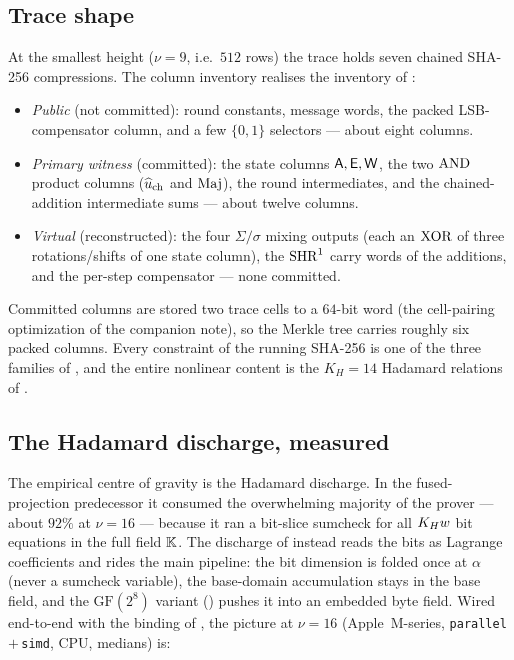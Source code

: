 \subsection{Trace shape}
\label{sec:impl-trace}

At the smallest height ($\nu=9$, i.e.\ $512$ rows) the trace holds seven
chained SHA-256 compressions. The column inventory realises the inventory
of :
\begin{itemize}[leftmargin=2em]
  \item \emph{Public} (not committed): round constants, message words, the
    packed LSB-compensator column, and a few $\{0,1\}$ selectors --- about
    eight columns.
  \item \emph{Primary witness} (committed): the state columns
    $\mathsf{A},\mathsf{E},\mathsf{W}$, the two $\operatorname{AND}$ product columns
    ($\widehat{u}_{\mathrm{ch}}$ and $\operatorname{Maj}$), the round intermediates, and the
    chained-addition intermediate sums --- about twelve columns.
  \item \emph{Virtual} (reconstructed): the four $\Sigma/\sigma$ mixing
    outputs (each an $\operatorname{XOR}$ of three rotations/shifts of one state
    column), the $\operatorname{SHR}^{1}$ carry words of the additions, and the per-step
    compensator --- none committed.
\end{itemize}
Committed columns are stored two trace cells to a $64$-bit word (the
cell-pairing optimization of the companion note), so the Merkle tree
carries roughly six packed columns. Every constraint of the running SHA-256 is one
of the three families of , and the entire nonlinear content is
the $K_H=14$ Hadamard relations of .

\subsection{The Hadamard discharge, measured}
\label{sec:impl-discharge}

The empirical centre of gravity is the Hadamard discharge. In the
fused-projection predecessor it consumed the overwhelming majority of the
prover --- about $92\%$ at $\nu=16$ --- because it ran a bit-slice sumcheck
for all $K_Hw$ bit equations in the full field $\mathbb{K}$. The discharge of
 instead reads the bits as Lagrange coefficients and
rides the main pipeline: the bit dimension is folded once at $\alpha$ (never
a sumcheck variable), the base-domain accumulation stays in the base field,
and the $\mathrm{GF}(2^8)$ variant () pushes it into an
embedded byte field. Wired end-to-end with the binding of
, the picture at $\nu=16$ (Apple~M-series,
\texttt{parallel}\,$+$\,\texttt{simd}, CPU, medians) is:

